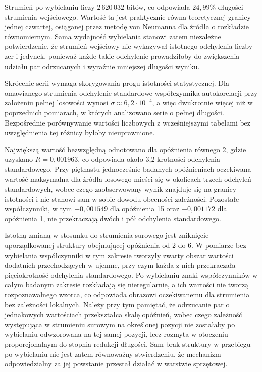 Strumień po wybielaniu liczy $2\,620\,032$ bitów, co odpowiada $24{,}99\%$ długości
strumienia wejściowego. Wartość ta jest praktycznie równa teoretycznej granicy jednej
czwartej, osiąganej przez metodę von Neumanna dla źródła o rozkładzie równomiernym.
Sama wydajność wybielania stanowi zatem niezależne potwierdzenie, że strumień wejściowy
nie wykazywał istotnego odchylenia liczby zer i jedynek, ponieważ każde takie odchylenie
prowadziłoby do zwiększenia udziału par odrzucanych i wyraźnie mniejszej długości
wyniku.

Skrócenie serii wymaga skorygowania progu istotności statystycznej. Dla omawianego
strumienia odchylenie standardowe współczynnika autokorelacji przy założeniu pełnej
losowości wynosi $\sigma \approx 6{,}2 \cdot 10^{-4}$, a więc dwukrotnie więcej niż
w poprzednich pomiarach, w których analizowano serie o pełnej długości. Bezpośrednie
porównywanie wartości liczbowych z wcześniejszymi tabelami bez uwzględnienia tej różnicy
byłoby nieuprawnione.

Największą wartość bezwzględną odnotowano dla opóźnienia równego 2, gdzie uzyskano
$R = 0{,}001963$, co odpowiada około 3,2-krotności odchylenia standardowego. Przy
piętnastu jednocześnie badanych opóźnieniach oczekiwana wartość maksymalna dla źródła
losowego mieści się w okolicach trzech odchyleń standardowych, wobec czego zaobserwowany
wynik znajduje się na granicy istotności i nie stanowi sam w sobie dowodu obecności
zależności. Pozostałe współczynniki, w tym $+0{,}001549$ dla opóźnienia 15 oraz
$-0{,}001172$ dla opóźnienia 1, nie przekraczają dwóch i pół odchylenia standardowego.

Istotną zmianą w stosunku do strumienia surowego jest zniknięcie uporządkowanej struktury
obejmującej opóźnienia od 2 do 6. W pomiarze bez wybielania współczynniki w tym zakresie
tworzyły zwarty obszar wartości dodatnich przechodzących w ujemne, przy czym każda z nich
przekraczała pięciokrotność odchylenia standardowego. Po wybielaniu znaki współczynników
w całym badanym zakresie rozkładają się nieregularnie, a ich wartości nie tworzą
rozpoznawalnego wzorca, co odpowiada obrazowi oczekiwanemu dla strumienia bez zależności
lokalnych. Należy przy tym pamiętać, że odrzucanie par o jednakowych wartościach
przekształca skalę opóźnień, wobec czego zależność występująca w strumieniu surowym na
określonej pozycji nie zostałaby po wybielaniu odwzorowana na tej samej pozycji, lecz
rozmyta w otoczeniu proporcjonalnym do stopnia redukcji długości. Sam brak struktury
w przebiegu po wybielaniu nie jest zatem równoważny stwierdzeniu, że mechanizm
odpowiedzialny za jej powstanie przestał działać w warstwie sprzętowej.

